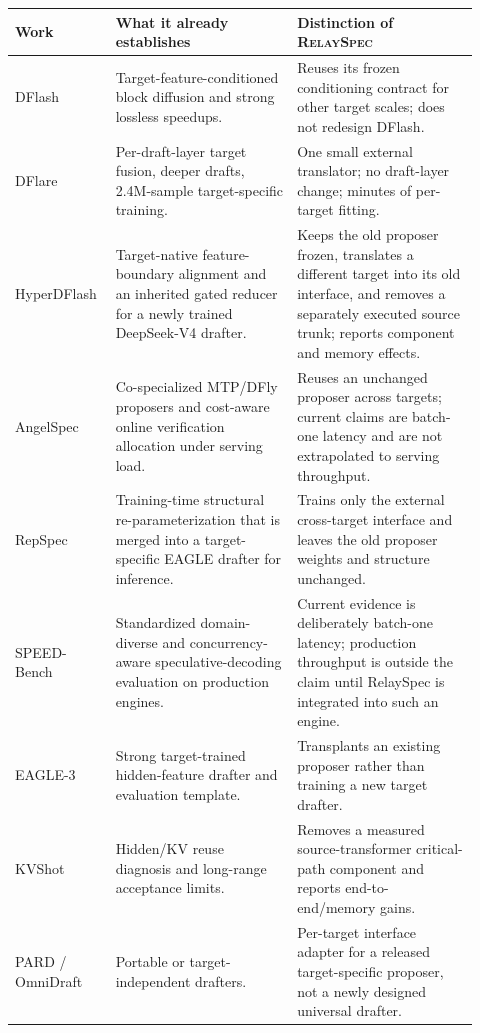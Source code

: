 \documentclass[10pt]{article}
\newcommand{\method}{\textsc{RelaySpec}}
\begin{document}
\begin{longtable}{@{}p{0.18\linewidth}p{0.37\linewidth}p{0.37\linewidth}@{}}
\toprule
Work & What it already establishes & Distinction of \method{} \\
\midrule
\endhead
DFlash \cite{chen2026dflash} & Target-feature-conditioned block diffusion and strong lossless speedups. & Reuses its frozen conditioning contract for other target scales; does not redesign DFlash. \\
DFlare \cite{zhang2026dflare} & Per-draft-layer target fusion, deeper drafts, 2.4M-sample target-specific training. & One small external translator; no draft-layer change; minutes of per-target fitting. \\
HyperDFlash \cite{lin2026hyperdflash} & Target-native feature-boundary alignment and an inherited gated reducer for a newly trained DeepSeek-V4 drafter. & Keeps the old proposer frozen, translates a different target into its old interface, and removes a separately executed source trunk; reports component and memory effects. \\
AngelSpec \cite{liu2026angelspec} & Co-specialized MTP/DFly proposers and cost-aware online verification allocation under serving load. & Reuses an unchanged proposer across targets; current claims are batch-one latency and are not extrapolated to serving throughput. \\
RepSpec \cite{huo2026repspec} & Training-time structural re-parameterization that is merged into a target-specific EAGLE drafter for inference. & Trains only the external cross-target interface and leaves the old proposer weights and structure unchanged. \\
SPEED-Bench \cite{abramovich2026speedbench} & Standardized domain-diverse and concurrency-aware speculative-decoding evaluation on production engines. & Current evidence is deliberately batch-one latency; production throughput is outside the claim until RelaySpec is integrated into such an engine. \\
EAGLE-3 \cite{li2025eagle3} & Strong target-trained hidden-feature drafter and evaluation template. & Transplants an existing proposer rather than training a new target drafter. \\
KVShot \cite{liu2026kvshot} & Hidden/KV reuse diagnosis and long-range acceptance limits. & Removes a measured source-transformer critical-path component and reports end-to-end/memory gains. \\
PARD / OmniDraft \cite{an2026pard,ramakrishnan2025omnidraft} & Portable or target-independent drafters. & Per-target interface adapter for a released target-specific proposer, not a newly designed universal drafter. \\

\end{longtable}
\end{document}
